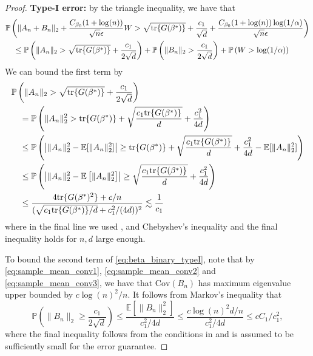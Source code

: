 \documentclass[11pt]{article}
\begin{document}
\begin{proof}
\bigskip
\noindent \textbf{Type-I error:} by the triangle inequality, we have that
\begin{align}
    &\mathbb{P}\left(\|A_n + B_n\|_2 + \frac{C_{\beta_0} (1+\log(n))}{\sqrt{n} \epsilon}W > \sqrt{\mathrm{tr}\{G(\beta^*)\}} + \frac{c_1}{\sqrt{d}} + \frac{C_{\beta_0}(1+\log(n))\log(1/\alpha)}{\sqrt{n} \epsilon}\right) \notag \\
    &\quad\leq \mathbb{P}\left(\|A_n\|_2> \sqrt{\mathrm{tr}\{G(\beta^*)\}} + \frac{c_1}{2\sqrt{d}}\right) + \mathbb{P} \left( \|B_n\|_2 > \frac{c_1}{2 \sqrt{d}} \right) + \mathbb{P}\left( W >  \log(1/\alpha) \right)
    \label{eq:beta_binary_typeI}
\end{align}
We can bound the first term by 
\begin{align}    &\mathbb{P}\left(\|A_n\|_2 > \sqrt{\mathrm{tr}\{G(\beta^*)\}} + \frac{c_1}{2\sqrt{d}}\right) \notag\\
    &\quad= \mathbb{P}\left(\|A_n\|^2_2 > \mathrm{tr}\{G(\beta^*)\} + \sqrt{\frac{c_1 \mathrm{tr}\{G(\beta^*)\}}{d}} + \frac{c_1^2}{4d}\right) \notag\\
    &\quad\leq \mathbb{P}\left( \left|\|A_n\|^2_2 - \mathbb{E}[\|A_n\|^2_2] \right| \geq \mathrm{tr}\{G(\beta^*)\} + \sqrt{\frac{c_1 \mathrm{tr}\{G(\beta^*)\}}{d}} + \frac{c_1^2}{4d} - \mathbb{E}[\|A_n\|^2_2] \right) \notag\\
     &\quad\leq \mathbb{P}\left( \left|\|A_n\|^2_2 - \mathbb{E}\left[\|A_n\|^2_2 \right] \right| \geq  \sqrt{\frac{c_1 \mathrm{tr}\{G(\beta^*)\}}{d}} + \frac{c_1^2}{4d} \right)
     \label{eq:scoretest_type1}\\
     &\quad\leq \frac{4\mathrm{tr}\{G(\beta^*)^2\} + c/n}{(\sqrt{c_1 \mathrm{tr}\{G(\beta^*)\}/d} + c_1^2/(4d))^2} \lesssim \frac{1}{c_1} \notag
\end{align}
where in the final line we used ,  and Chebyshev's inequality and the final inequality holds for $n, d$ large enough.   

To bound the second term of \eqref{eq:beta_binary_typeI}, note that by \eqref{eq:sample_mean_conv1}, \eqref{eq:sample_mean_conv2} and \eqref{eq:sample_mean_conv3}, we have that $\mathrm{Cov}(B_n)$ has maximum eigenvalue upper bounded by $c \log(n)^2/n$. It follows from Markov's inequality that 
\begin{equation}
    \mathbb{P} \left( \|B_n\|_2 \geq \frac{c_1}{2\sqrt{d}}  \right) \leq \frac{\mathbb{E}[\|B_n\|^2_2]}{c_1^2/4d} \leq \frac{c \log(n)^2d/n}{c_1^2/4d} \leq cC_1/c_1^2,
    \label{eq:sample_mean_convergence}
\end{equation}
where the final inequality follows from the conditions in  and is assumed to be sufficiently small for the error guarantee.


\end{proof}
\end{document}
